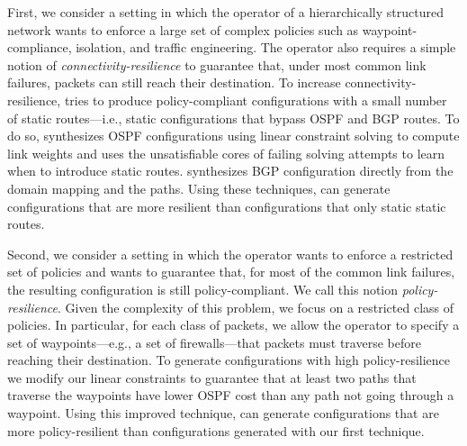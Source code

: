 First, we consider a setting in which the operator 
of a hierarchically structured network
wants to 
enforce a large set of complex policies such as waypoint-compliance, isolation, and traffic engineering.
The operator also requires a simple notion of \emph{connectivity-resilience} to 
guarantee that, under most common link failures,
packets can still reach their destination.
To increase connectivity-resilience, \name tries to produce policy-compliant configurations with a small number of static routes---i.e., static configurations that bypass OSPF and BGP routes.
To do so, \name synthesizes OSPF configurations using linear constraint solving to compute
link weights and uses the unsatisfiable cores
of failing solving attempts to learn when to introduce static routes.
\name synthesizes BGP configuration directly from the domain mapping and the paths.
Using these techniques, \name can generate configurations that are
 more resilient than configurations that only static static routes.

Second, we consider a setting in which the operator 
wants to 
enforce a restricted set of policies and wants to guarantee
that, for most of the common link failures, the resulting configuration is still policy-compliant.
We call this notion \emph{policy-resilience}.
Given the complexity of this problem, we focus on a restricted class of policies.
In particular, for each class of packets, we allow the operator to specify a set of waypoints---e.g.,
a set of firewalls---that packets must traverse before reaching their destination.
To generate configurations with high policy-resilience 
we modify our linear constraints
to guarantee that at least two paths that traverse the waypoints
have lower OSPF cost than any path not going through a waypoint. 
Using this improved technique, \name can generate configurations that are
 more policy-resilient than configurations generated with our first technique.


